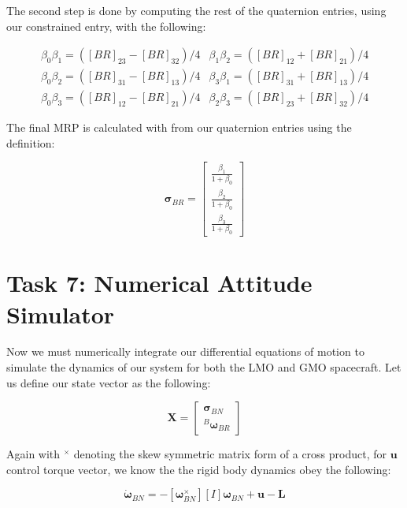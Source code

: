 \documentclass[paper]{aiaaNew}
\begin{document}
The second step is done by computing the rest of the quaternion entries, using our constrained entry, with the following: 

\begin{equation}
  \begin{array}{ll}{\beta_{0} \beta_{1}=\left([BR]_{23}-[BR]_{32}\right) / 4} & {\beta_{1} \beta_{2}=\left([BR]_{12}+[BR]_{21}\right) / 4} \\ {\beta_{0} \beta_{2}=\left([BR]_{31}-[BR]_{13}\right) / 4} & {\beta_{3} \beta_{1}=\left([BR]_{31}+[BR]_{13}\right) / 4} \\ {\beta_{0} \beta_{3}=\left([BR]_{12}-[BR]_{21}\right) / 4} & {\beta_{2} \beta_{3}=\left([BR]_{23}+[BR]_{32}\right) / 4}\end{array}
\end{equation}

The final MRP is calculated with from our quaternion entries using the definition:

\begin{equation}
  \bm{\sigma}_{BR} = \begin{bmatrix}
  \frac{\beta_1}{1+\beta_0} \\
  \frac{\beta_2}{1+\beta_0} \\
  \frac{\beta_3}{1+\beta_0} 
  \end{bmatrix}
\end{equation}






\section*{Task 7: Numerical Attitude Simulator}
Now we must numerically integrate our differential equations of motion to simulate the dynamics of our system for both the LMO and GMO spacecraft. Let us define our state vector as the following: 

\begin{equation}
  \bm{X} = \begin{bmatrix}
  \bm{\sigma}_{BN} \\
  ^B\bm{\omega}_{BR}
  \end{bmatrix}
\end{equation}

Again with $^\times$ denoting the skew symmetric matrix form of a cross product, for $\bm{u}$ control torque vector, we know the the rigid body dynamics obey the following:

\begin{equation}
  [I]\bm{\dot{\omega}}_{BN} = -[\boldsymbol{\omega}_{BN}^\times][I]\bm{\omega}_{BN} + \bm{u} - \bm{L}
\end{equation}
\end{document}
